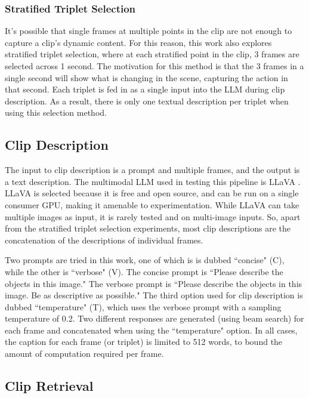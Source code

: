 \subsubsection{Stratified Triplet Selection}
It's possible that single frames at multiple points in the clip are not enough to capture a clip's dynamic content.
For this reason, this work also explores stratified triplet selection, where at each stratified point in the clip, 3 frames are selected across 1 second.
The motivation for this method is that the 3 frames in a single second will show what is changing in the scene, capturing the action in that second.
Each triplet is fed in as a single input into the LLM during clip description.
As a result, there is only one textual description per triplet when using this selection method.

\subsection{Clip Description}

The input to clip description is a prompt and multiple frames, and the output is a text description.
The multimodal LLM used in testing this pipeline is LLaVA \cite{llava}.
LLaVA is selected because it is free and open source, and can be run on a single consumer GPU, making it amenable to experimentation.
While LLaVA can take multiple images as input, it is rarely tested and on multi-image inputs.
So, apart from the stratified triplet selection experiments, most clip descriptions are the concatenation of the descriptions of individual frames.

Two prompts are tried in this work, one of which is is dubbed ``concise" (C), while the other is ``verbose" (V).
The concise prompt is ``Please describe the objects in this image."
The verbose prompt is ``Please describe the objects in this image. Be as descriptive as possible."
The third option used for clip description is dubbed ``temperature" (T), which uses the verbose prompt with a sampling temperature of 0.2. 
Two different responses are generated (using beam search) for each frame and concatenated when using the ``temperature" option.
In all cases, the caption for each frame (or triplet) is limited to 512 words, to bound the amount of computation required per frame.

\subsection{Clip Retrieval}

